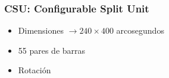 
\begin{frame}
    \frametitle{CSU: Configurable Split Unit}
    \begin{itemize}[<+->]
    \item Dimensiones $\rightarrow 240\times400$ arcosegundos
    \item 55 pares de barras
    \item Rotación
    \end{itemize}
    \endblock{}
\end{frame}

